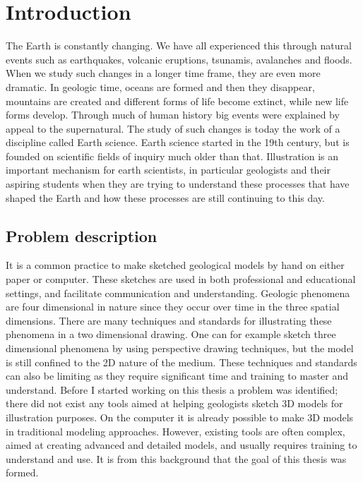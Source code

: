 \documentclass[a4paper,12pt]{report}
\begin{document}
\clearpage

\tableofcontents 



\clearpage

\pagestyle{plain}


\chapter{Introduction}
\label{sec:intro}

The Earth is constantly changing. We have all experienced this through natural events such as earthquakes, volcanic eruptions, tsunamis, avalanches and floods. When we study such changes in a longer time frame, they are even more dramatic. In geologic time, oceans are formed and then they disappear, mountains are created and different forms of life become extinct, while new life forms develop. Through much of human history big events were explained by appeal to the supernatural. The study of such changes is today the work of a discipline called Earth science. Earth science started in the 19th century, but is founded on scientific fields of inquiry much older than that. Illustration is an important mechanism for earth scientists, in particular geologists and their aspiring students when they are trying to understand these processes that have shaped the Earth and how these processes are still continuing to this day.

\section{Problem description}

It is a common practice to make sketched geological models by hand on either paper or computer. These sketches are used in both professional and educational settings, and facilitate communication and understanding. Geologic phenomena are four dimensional in nature since they occur over time in the three spatial dimensions. There are many techniques and standards for illustrating these phenomena in a two dimensional drawing. One can for example sketch three dimensional phenomena by using perspective drawing techniques, but the model is still confined to the 2D nature of the medium. These techniques and standards can also be limiting  as they require significant time and training to master and understand. Before I started working on this thesis a problem was identified; there did not exist any tools aimed at helping geologists sketch 3D models for illustration purposes. On the computer it is already possible to make 3D models in traditional modeling approaches. However, existing tools are often complex, aimed 
at creating advanced and detailed models, and usually requires training to understand and use. It is from this background that the goal of this thesis was formed. 
\end{document}
